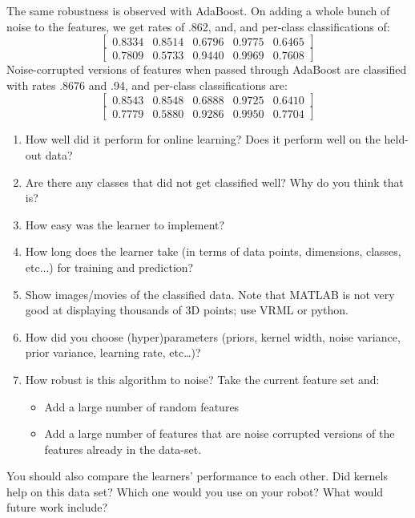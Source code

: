 \documentclass[letterpaper]{article}
\begin{document}
The same robustness is observed with AdaBoost. On adding a whole bunch of noise to the features, we get rates of .862, and, and per-class classifications of:
$$\begin{bmatrix} 0.8334 &   0.8514 &   0.6796  & 0.9775  &  0.6465\end{bmatrix}$$
$$\begin{bmatrix} 0.7809  &  0.5733  &  0.9440&    0.9969    &0.7608\end{bmatrix}$$
Noise-corrupted versions of features when passed through AdaBoost are classified with rates .8676 and .94, and per-class classifications are:
$$\begin{bmatrix} 0.8543 &   0.8548 &   0.6888&    0.9725  &  0.6410\end{bmatrix}$$
$$\begin{bmatrix} 0.7779  &  0.5880  &  0.9286  &  0.9950 &   0.7704\end{bmatrix}$$

\begin{enumerate}
\item How well did it perform for online learning?  Does it perform well on the held-out data?
\item Are there any classes that did not get classified well?  Why do you think that is?
\item How easy was the learner to implement?
\item How long does the learner take (in terms of data points, dimensions, classes, etc...) for training and prediction?
\item Show images/movies of the classified data.  Note that MATLAB is not very good at displaying thousands of 3D points; use VRML or python.
\item How did you choose (hyper)parameters (priors, kernel width, noise variance, prior variance, learning rate, etc\ldots)?
\item How robust is this algorithm to noise? Take the current feature set and:
  \begin{itemize}
  \item Add a large number of random features
  \item Add a large number of features that are noise corrupted versions of the features already in the data-set.
  \end{itemize}

\end{enumerate}

You should also compare the learners' performance to each other.  Did kernels help on this data set?  Which one would you use on your robot?  What would future work include?
\end{document}
